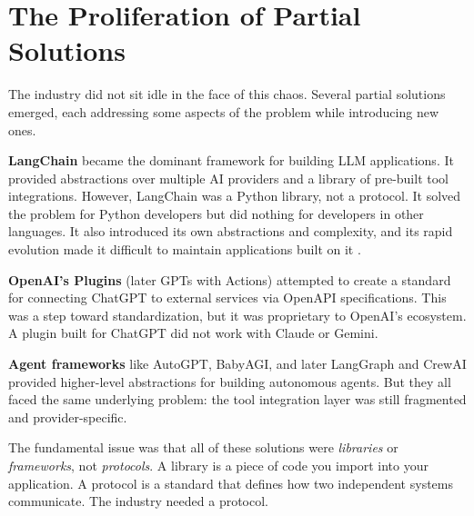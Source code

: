 \section{The Proliferation of Partial Solutions}
The industry did not sit idle in the face of this chaos. Several partial solutions emerged, each addressing some aspects of the problem while introducing new ones.

\textbf{LangChain} became the dominant framework for building LLM applications. It provided abstractions over multiple AI providers and a library of pre-built tool integrations. However, LangChain was a Python library, not a protocol. It solved the problem for Python developers but did nothing for developers in other languages. It also introduced its own abstractions and complexity, and its rapid evolution made it difficult to maintain applications built on it \cite{anthropic2024mcp}.

\textbf{OpenAI's Plugins} (later GPTs with Actions) attempted to create a standard for connecting ChatGPT to external services via OpenAPI specifications. This was a step toward standardization, but it was proprietary to OpenAI's ecosystem. A plugin built for ChatGPT did not work with Claude or Gemini.

\textbf{Agent frameworks} like AutoGPT, BabyAGI, and later LangGraph and CrewAI provided higher-level abstractions for building autonomous agents. But they all faced the same underlying problem: the tool integration layer was still fragmented and provider-specific.

The fundamental issue was that all of these solutions were \textit{libraries} or \textit{frameworks}, not \textit{protocols}. A library is a piece of code you import into your application. A protocol is a standard that defines how two independent systems communicate. The industry needed a protocol.

